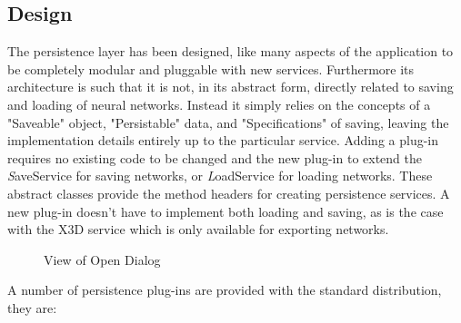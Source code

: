 \documentclass{acm_proc_article-sp}
\begin{document}
\subsection{Design}
{
The persistence layer has been designed, like many aspects of the
application to be completely modular and pluggable with new services. Furthermore its architecture is such that it is not, in its abstract form, directly related to saving and loading of neural networks. Instead it simply relies on the concepts of a "Saveable" object, "Persistable" data, and "Specifications" of saving, leaving the implementation details entirely up to the particular service. Adding a plug{}-in requires no existing code to be changed and the new plug{}-in to extend the {\textit SaveService} for saving networks, or {\textit LoadService} for loading networks. These abstract classes provide the method headers for creating persistence services. A new plug{}-in doesn't have to implement both loading and saving, as is the case with the X3D service which is only available for exporting networks.
\begin{figure}[t]
\centering
{}
\caption{View of Open Dialog}
\label{fig:persistence:open}
\end{figure}
A number of persistence plug{}-ins are provided with the standard
distribution, they are:

}
\end{document}
